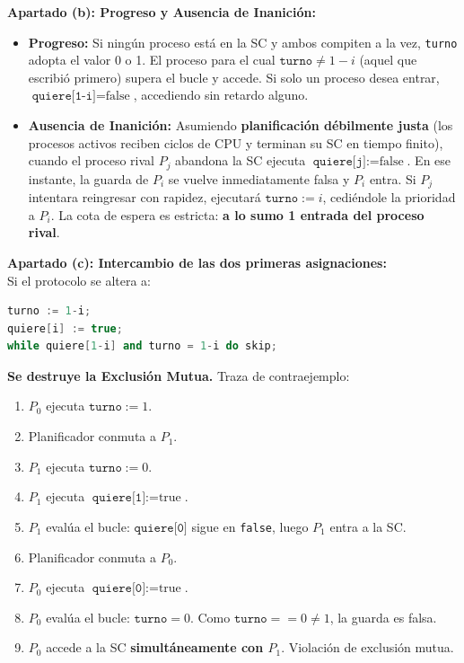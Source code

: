 \documentclass[11pt,a4paper,twoside,openright]{report}
\begin{document}
\begin{solucion}
\textbf{Apartado (b): Progreso y Ausencia de Inanición:}\\
\begin{itemize}[leftmargin=*]
    \item \textbf{Progreso:} Si ningún proceso está en la SC y ambos compiten a la vez, \texttt{turno} adopta el valor 0 o 1. El proceso para el cual $\texttt{turno} \ne 1-i$ (aquel que escribió primero) supera el bucle y accede. Si solo un proceso desea entrar, $\texttt{quiere[1-i]} = \text{false}$, accediendo sin retardo alguno.
    \item \textbf{Ausencia de Inanición:} Asumiendo \textbf{planificación débilmente justa} (los procesos activos reciben ciclos de CPU y terminan su SC en tiempo finito), cuando el proceso rival $P_j$ abandona la SC ejecuta $\texttt{quiere[j]} := \text{false}$. En ese instante, la guarda de $P_i$ se vuelve inmediatamente falsa y $P_i$ entra. Si $P_j$ intentara reingresar con rapidez, ejecutará $\texttt{turno} := i$, cediéndole la prioridad a $P_i$. La cota de espera es estricta: \textbf{a lo sumo 1 entrada del proceso rival}.
\end{itemize}

\textbf{Apartado (c): Intercambio de las dos primeras asignaciones:}\\
Si el protocolo se altera a:
\begin{lstlisting}[language=C++]
turno := 1-i;
quiere[i] := true;
while quiere[1-i] and turno = 1-i do skip;
\end{lstlisting}
\textbf{Se destruye la Exclusión Mutua.} Traza de contraejemplo:
\begin{enumerate}[leftmargin=*,noitemsep]
    \item $P_0$ ejecuta $\texttt{turno} := 1$.
    \item Planificador conmuta a $P_1$.
    \item $P_1$ ejecuta $\texttt{turno} := 0$.
    \item $P_1$ ejecuta $\texttt{quiere[1]} := \text{true}$.
    \item $P_1$ evalúa el bucle: $\texttt{quiere[0]}$ sigue en \texttt{false}, luego $P_1$ entra a la SC.
    \item Planificador conmuta a $P_0$.
    \item $P_0$ ejecuta $\texttt{quiere[0]} := \text{true}$.
    \item $P_0$ evalúa el bucle: $\texttt{turno} = 0$. Como $\texttt{turno} == 0 \ne 1$, la guarda es falsa.
    \item $P_0$ accede a la SC \textbf{simultáneamente con $P_1$}. Violación de exclusión mutua.
\end{enumerate}


\end{solucion}
\end{document}
